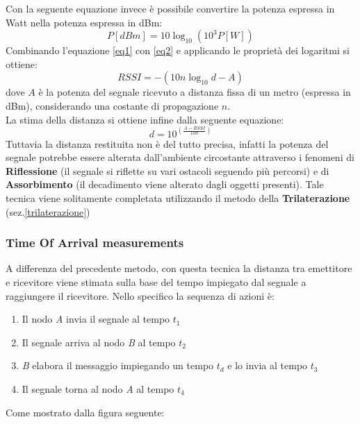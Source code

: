 Con la seguente equazione invece è possibile convertire la potenza espressa in Watt nella potenza espressa in dBm:
\begin{equation}
P[dBm] = 10\log_{10}(10^3P[W])
\label{eq2}
\end{equation}
Combinando l'equazione \ref{eq1} con \ref{eq2} e applicando le proprietà dei logaritmi si ottiene:
\begin{equation}
RSSI = -(10 n \log_{10} d - A)
\label{eq3}
\end{equation}
dove $A$ è la potenza del segnale ricevuto a distanza fissa di un metro (espressa in dBm), considerando una costante di propagazione $n$.\\
La stima della distanza si ottiene infine dalla seguente equazione:
\begin{equation}
d = 10 ^{(\frac{A - RSSI}{10n})}
\label{eq4}
\end{equation}
Tuttavia la distanza restituita non è del tutto precisa, infatti la potenza del segnale potrebbe essere alterata dall'ambiente circostante attraverso i fenomeni di \textbf{Riflessione} (il segnale si riflette su vari ostacoli seguendo più percorsi) e di \textbf{Assorbimento} (il decadimento viene alterato dagli oggetti presenti). Tale tecnica viene solitamente completata utilizzando il metodo della \textbf{Trilaterazione} (sez.\ref{trilaterazione})\\


\subsubsection{Time Of Arrival measurements}  
\label{toa}
A differenza del precedente metodo, con questa tecnica la distanza tra emettitore e ricevitore viene stimata sulla base del tempo impiegato dal segnale a raggiungere il ricevitore. Nello specifico la sequenza di azioni è:
\begin{enumerate}
	\item Il nodo \textit{A} invia il segnale al tempo $t_1$
	\item Il segnale arriva al nodo \textit{B} al tempo $t_2$
	\item \textit{B} elabora il messaggio impiegando un tempo $t_d$ e lo invia al tempo $t_3$
	\item Il segnale torna al nodo \textit{A} al tempo $t_4$
\end{enumerate}
Come mostrato dalla figura seguente:

